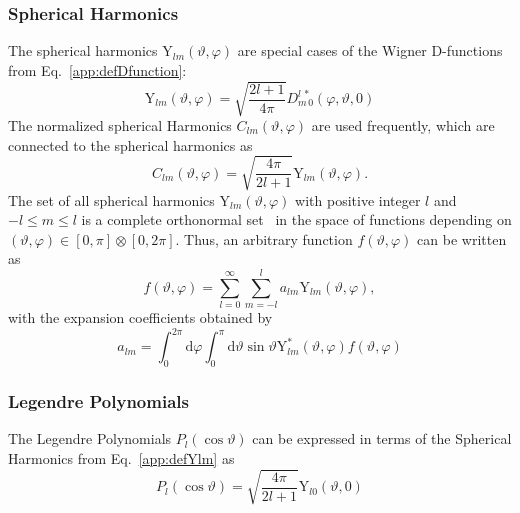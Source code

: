 \subsubsection*{Spherical Harmonics}
The spherical harmonics $\text{Y}_{lm}(\vartheta,\varphi)$ are special cases of the Wigner D-functions~\cite{varshalovich1988} from Eq.~\eqref{app:defDfunction}:
\begin{equation}
\label{app:defYlm}
\text{Y}_{lm}(\vartheta,\varphi)=\sqrt{\frac{2l+1}{4\pi}}
D^{l\,*}_{m\,0}(\varphi,\vartheta,0)
\end{equation}
The normalized spherical Harmonics $C_{lm}(\vartheta,\varphi)$ are used frequently, which are connected to the spherical harmonics as
\begin{equation}
C_{lm}(\vartheta,\varphi) = \sqrt{\frac{4\pi}{2l+1}}\text{Y}_{lm}(\vartheta,\varphi).
\end{equation}
The set of all spherical harmonics $\text{Y}_{lm}(\vartheta,\varphi)$ with positive integer $l$ and $-l\leq m \leq l$ is a complete orthonormal set~\cite{varshalovich1988} in the space of functions depending on $(\vartheta,\varphi)\in [0,\pi]\otimes [0,2\pi]$. Thus, an arbitrary function $f(\vartheta,\varphi)$ can be written as
\begin{equation}
f(\vartheta,\varphi)=\sum_{l=0}^\infty \sum_{m=-l}^l a_{lm}\text{Y}_{lm}(\vartheta,\varphi),
\end{equation}
with the expansion coefficients obtained by
\begin{equation}
a_{lm}=\int_0^{2\pi}\text{d}\varphi\int_0^\pi\text{d}\vartheta \sin\vartheta \text{Y}^{*}_{lm}(\vartheta,\varphi)f(\vartheta,\varphi)
\end{equation}

\subsubsection*{Legendre Polynomials}
The Legendre Polynomials $P_l(\cos\vartheta)$ can be expressed in terms of the Spherical Harmonics from Eq.~\eqref{app:defYlm} as
\begin{equation}
P_l(\cos\vartheta)=\sqrt{\frac{4\pi}{2l+1}}\text{Y}_{l0}(\vartheta,0)
\end{equation}
